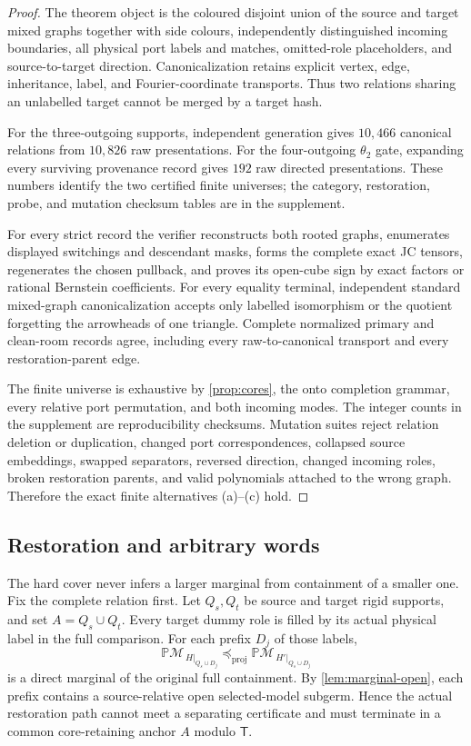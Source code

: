 \documentclass[11pt]{article}
\theoremstyle{remark}
\newcommand{\M}{\mathcal M}
\newcommand{\Tmove}{\mathsf T}
\newcommand{\preceqproj}{\preceq_{\!\mathrm{proj}}}
\newcommand{\PM}{\mathbb P\!\M}
\begin{document}
\begin{proof}
The theorem object is the coloured disjoint union of the source and target
mixed graphs together with side colours, independently distinguished incoming
boundaries, all physical port labels and matches, omitted-role placeholders,
and source-to-target direction.  Canonicalization retains explicit vertex,
edge, inheritance, label, and Fourier-coordinate transports.  Thus two
relations sharing an unlabelled target cannot be merged by a target hash.

For the three-outgoing supports, independent generation gives $10{,}466$
canonical relations from $10{,}826$ raw presentations.  For the
four-outgoing $\theta_2$ gate, expanding every surviving provenance record
gives $192$ raw directed presentations.  These numbers identify the two
certified finite universes; the category, restoration, probe, and mutation
checksum tables are in the supplement.

For every strict record the verifier reconstructs both rooted graphs,
enumerates displayed switchings and descendant masks, forms the complete
exact JC tensors, regenerates the chosen pullback, and proves its open-cube
sign by exact factors or rational Bernstein coefficients.  For every equality
terminal, independent standard mixed-graph canonicalization accepts only
labelled isomorphism or the quotient forgetting the arrowheads of one
triangle.  Complete normalized primary and clean-room records agree,
including every raw-to-canonical transport and every restoration-parent
edge.

The finite universe is exhaustive by \cref{prop:cores}, the onto completion
grammar, every relative port permutation, and both incoming modes.  The
integer counts in the supplement are reproducibility checksums.  Mutation suites reject
relation deletion or duplication, changed port correspondences, collapsed
source embeddings, swapped separators, reversed direction, changed
incoming roles, broken restoration parents, and valid polynomials attached
to the wrong graph.  Therefore the exact finite alternatives (a)--(c) hold.
\end{proof}

\subsection{Restoration and arbitrary words}

The hard cover never infers a larger marginal from containment of a smaller
one.  Fix the complete relation first.  Let $Q_s,Q_t$ be source and target
rigid supports, and set $A=Q_s\cup Q_t$.  Every target dummy role is filled by
its actual physical label in the full comparison.  For each prefix $D_j$ of
those labels,
\[
\PM_{\,H|_{Q_s\cup D_j}}\preceqproj
\PM_{\,H'|_{Q_s\cup D_j}}
\]
is a direct marginal of the original full containment.  By
\cref{lem:marginal-open}, each prefix contains a source-relative open
selected-model subgerm.  Hence
the actual restoration path cannot meet a separating certificate and must
terminate in a common core-retaining anchor $A$ modulo $\Tmove$.
\end{document}
